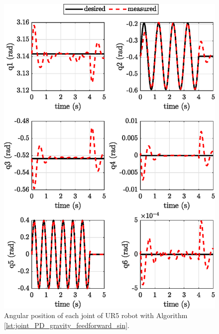 \begin{figure}[H]
	\centering
	\includegraphics{images/act_1.7_sin/joint_position.eps}
	\caption{Angular position of each joint of UR5 robot with Algorithm \ref{lst:joint_PD_gravity_feedforward_sin}.}
	\label{fig:act_1.7_sin_joint_position}
\end{figure}
 
